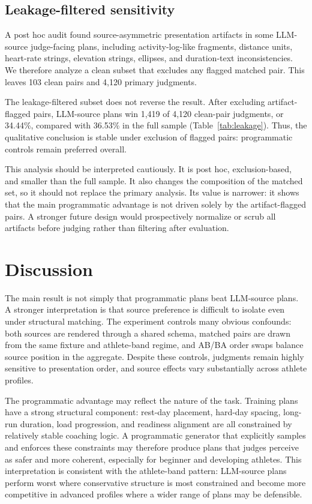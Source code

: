\documentclass[11pt]{article}
\begin{document}
\subsection{Leakage-filtered sensitivity}

A post hoc audit found source-asymmetric presentation artifacts in some LLM-source judge-facing plans, including activity-log-like fragments, distance units, heart-rate strings, elevation strings, ellipses, and duration-text inconsistencies. We therefore analyze a clean subset that excludes any flagged matched pair. This leaves 103 clean pairs and 4,120 primary judgments.

The leakage-filtered subset does not reverse the result. After excluding artifact-flagged pairs, LLM-source plans win 1,419 of 4,120 clean-pair judgments, or 34.44\%, compared with 36.53\% in the full sample (Table~\ref{tab:leakage}). Thus, the qualitative conclusion is stable under exclusion of flagged pairs: programmatic controls remain preferred overall.

This analysis should be interpreted cautiously. It is post hoc, exclusion-based, and smaller than the full sample. It also changes the composition of the matched set, so it should not replace the primary analysis. Its value is narrower: it shows that the main programmatic advantage is not driven solely by the artifact-flagged pairs. A stronger future design would prospectively normalize or scrub all artifacts before judging rather than filtering after evaluation.

\section{Discussion}

The main result is not simply that programmatic plans beat LLM-source plans. A stronger interpretation is that source preference is difficult to isolate even under structural matching. The experiment controls many obvious confounds: both sources are rendered through a shared schema, matched pairs are drawn from the same fixture and athlete-band regime, and AB/BA order swaps balance source position in the aggregate. Despite these controls, judgments remain highly sensitive to presentation order, and source effects vary substantially across athlete profiles.

The programmatic advantage may reflect the nature of the task. Training plans have a strong structural component: rest-day placement, hard-day spacing, long-run duration, load progression, and readiness alignment are all constrained by relatively stable coaching logic. A programmatic generator that explicitly samples and enforces these constraints may therefore produce plans that judges perceive as safer and more coherent, especially for beginner and developing athletes. This interpretation is consistent with the athlete-band pattern: LLM-source plans perform worst where conservative structure is most constrained and become more competitive in advanced profiles where a wider range of plans may be defensible.
\end{document}
